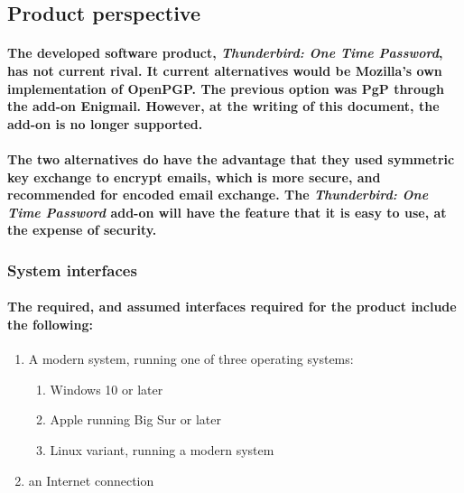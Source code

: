 \subsection{Product perspective}
%
%
\paragraph{The developed software product, \emph{Thunderbird: One Time Password}, has not current rival. It current alternatives would be Mozilla's own implementation of OpenPGP. The previous option was PgP through the add-on Enigmail. However, at the writing of this document, the add-on is no longer supported.}
\paragraph{The two alternatives do have the advantage that they used symmetric key exchange to encrypt emails, which is more secure, and recommended for encoded email exchange. The \emph{Thunderbird: One Time Password} add-on will have the feature that it is easy to use, at the expense of security.}


\subsubsection{System interfaces}
\paragraph{The required, and assumed interfaces required for the product include the following:}
\begin{enumerate}
\item A modern system, running one of three operating systems:
\begin{enumerate}
\item Windows 10 or later
\item Apple running Big Sur or later
\item Linux variant, running a modern system
\end{enumerate}
\item an Internet connection
\end{enumerate}


